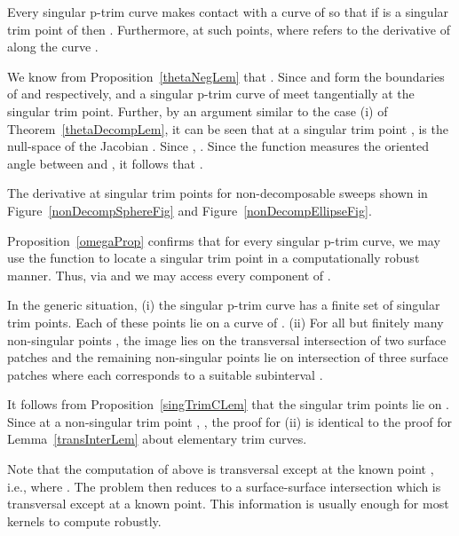 \documentclass{elsart5p}
\newcommand{\eat}[1]{}
\begin{document}
\begin{prop} \label{omegaProp}
Every singular p-trim curve  makes contact with a curve  of  
so that if
 is a singular trim point of  then .  Furthermore, at 
such points,  where  refers to the derivative of  
along the curve .
\end{prop}
 We know from Proposition~\ref{thetaNegLem} that .  
Since  and  form the boundaries of  and  respectively, 
 and a singular p-trim curve  of  meet tangentially at the singular trim point.
Further, by an argument similar to the case (i) of Theorem~\ref{thetaDecompLem}, it can be seen that 
at a singular trim point , 
 is the null-space of the Jacobian .  Since 
, .  
Since the function  measures the oriented angle between  and , 
it follows that .

The derivative  at singular trim points for non-decomposable sweeps shown in 
Figure~\ref{nonDecompSphereFig} and Figure~\ref{nonDecompEllipseFig}.
\hfill 

\eat{
\begin{figure}
 \centering
 \texttt{[image: plot]}
 \caption{The plot of the function  for the sweep example shown in 
Figure~\ref{nonDecompSphereFig}.}
 \label{varphiPlotFig}
\end{figure}
}

Proposition~\ref{omegaProp} confirms that for every singular p-trim curve, we may use the 
function  to locate a singular trim point  in a computationally robust manner.  Thus, 
via  and  we may access every component of .

\begin{prop}
In the generic situation, (i) the singular p-trim curve  has a finite set of singular trim points.  Each of these 
points lie on a curve of . (ii) For all but finitely many non-singular points , the image 
 lies on the transversal intersection of two surface patches  
and the remaining non-singular points lie on intersection of three surface patches 
where each  corresponds to a suitable 
subinterval . 
\end{prop}
It follows from Proposition~\ref{singTrimCLem} that the singular trim points lie on . Since at a 
non-singular trim point , , the proof for (ii) is identical to the proof for Lemma~\ref{transInterLem} about elementary trim curves.
\hfill 

Note that the computation of  above is transversal except at the known point , i.e., where . The problem then reduces to a surface-surface intersection which is transversal except at a known point. This information is usually enough for most kernels to compute  robustly.
\end{document}
